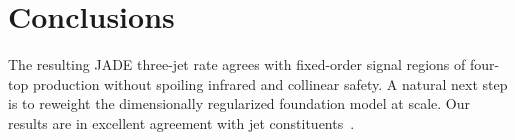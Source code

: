 \section{Conclusions}\label{sec:conclusions}

The resulting JADE three-jet rate agrees with fixed-order signal regions
of four-top production without spoiling infrared and collinear safety. A
natural next step is to reweight the dimensionally regularized
foundation model at scale. Our results are in excellent agreement with
jet
constituents~\cite{TPC:0413-The-Shape-of-Likelihood-Ratios-September-24-2026}.

